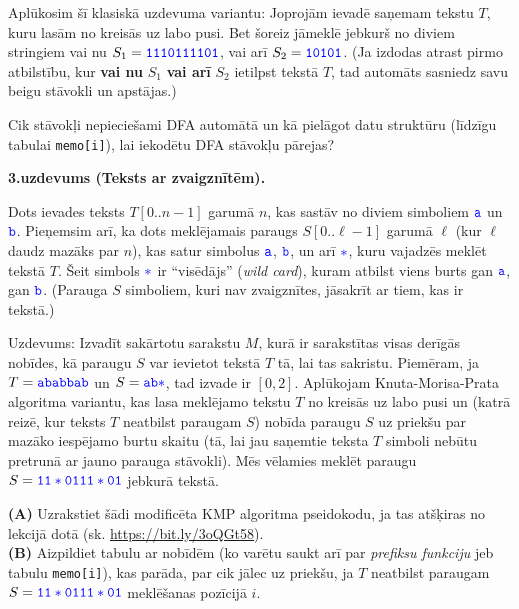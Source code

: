 \documentclass[a4paper,12pt]{article}
\begin{document}
Aplūkosim šī klasiskā uzdevuma variantu: Joprojām ievadē saņemam tekstu $T$, kuru lasām no kreisās uz labo pusi.
Bet šoreiz jāmeklē jebkurš no diviem stringiem \textendash{} vai nu 
$S_1 = \textcolor{blue}{\mathtt{1110111101}}$, vai arī
$S_2 = \textcolor{blue}{\mathtt{10101}}$. (Ja izdodas atrast pirmo atbilstību, kur 
{\bf vai nu} $S_1$ {\bf vai arī} $S_2$ ietilpst tekstā $T$, tad automāts sasniedz savu beigu stāvokli 
un apstājas.)

Cik stāvokļi nepieciešami DFA automātā un kā pielāgot datu struktūru (līdzīgu tabulai {\tt memo[i]}), 
lai iekodētu DFA stāvokļu pārejas?


\vspace{20pt}
{\bf 3.uzdevums (Teksts ar zvaigznītēm).}

Dots ievades teksts $T[0..n-1]$ garumā $n$, kas sastāv no diviem simboliem
$\textcolor{blue}{\mathtt{a}}$ un $\textcolor{blue}{\mathtt{b}}$.
Pieņemsim arī, ka dots meklējamais paraugs $S[0..\ell-1]$ garumā $\ell$ (kur $\ell$ daudz mazāks par $n$), kas
satur simbolus $\textcolor{blue}{\mathtt{a}}$, $\textcolor{blue}{\mathtt{b}}$, un arī $\textcolor{blue}{\mathtt{\ast}}$, 
kuru vajadzēs meklēt tekstā $T$. Šeit simbols $\textcolor{blue}{\mathtt{\ast}}$ ir ``visēdājs'' ({\em wild card}), 
kuram atbilst viens burts \textendash{} gan $\textcolor{blue}{\mathtt{a}}$, gan 
$\textcolor{blue}{\mathtt{b}}$. (Parauga $S$ simboliem, kuri nav zvaigznītes, jāsakrīt ar tiem, kas ir tekstā.)

Uzdevums: Izvadīt sakārtotu sarakstu $M$, kurā ir sarakstītas visas derīgās nobīdes, kā paraugu $S$ var ievietot 
tekstā $T$ tā, lai tas sakristu. Pie\-mē\-ram, ja $T =\textcolor{blue}{\mathtt{ababbab}}$ un 
$S=\textcolor{blue}{\mathtt{ab\ast}}$, tad izvade ir $[0,2]$.
Aplūkojam Knuta-Morisa-Prata algoritma variantu, kas lasa meklējamo tekstu $T$ no kreisās uz labo pusi un 
(katrā reizē, kur teksts $T$ neatbilst paraugam $S$) nobīda paraugu $S$ uz priekšu par mazāko iespējamo burtu skaitu 
(tā, lai jau saņemtie teksta $T$ simboli nebūtu pretrunā ar jauno parauga stāvokli). 
Mēs vēlamies meklēt paraugu $S = \textcolor{blue}{\mathtt{11\ast0111\ast01}}$ jebkurā tekstā.

{\bf (A)} Uzrakstiet šādi modificēta KMP algoritma pseidokodu, ja tas atšķiras no lekcijā dotā (sk. \url{https://bit.ly/3oQGt58}).\\
{\bf (B)} Aizpildiet tabulu ar nobīdēm (ko varētu saukt arī par {\em prefiksu funkciju} jeb tabulu {\tt memo[i]}), kas parāda, 
par cik jālec uz priekšu, ja $T$ neatbilst paraugam $S = \textcolor{blue}{\mathtt{11\ast0111\ast01}}$ meklēšanas pozīcijā $i$.
\end{document}
